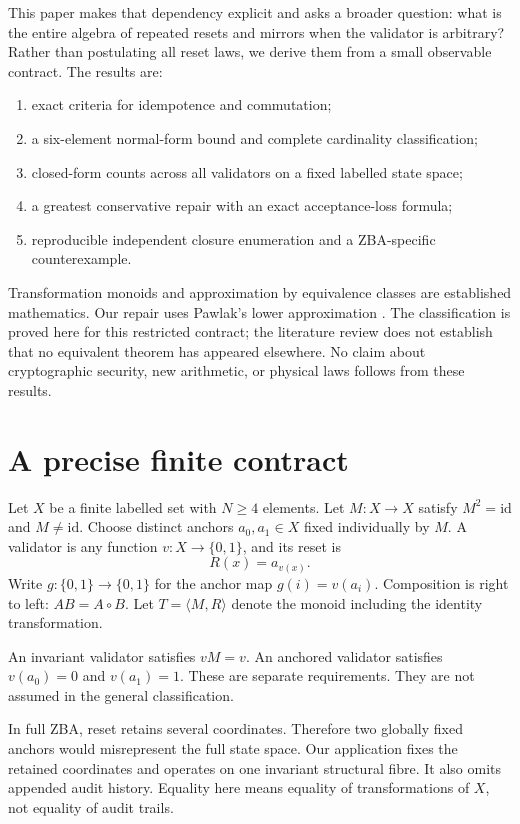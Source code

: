 \documentclass[11pt,a4paper]{article}
\newcommand{\id}{\mathrm{id}}
\begin{document}
This paper makes that dependency explicit and asks a broader question: what is the entire algebra of repeated resets and mirrors when the validator is arbitrary? Rather than postulating all reset laws, we derive them from a small observable contract. The results are:
\begin{enumerate}
\item exact criteria for idempotence and commutation;
\item a six-element normal-form bound and complete cardinality classification;
\item closed-form counts across all validators on a fixed labelled state space;
\item a greatest conservative repair with an exact acceptance-loss formula;
\item reproducible independent closure enumeration and a ZBA-specific counterexample.
\end{enumerate}
Transformation monoids and approximation by equivalence classes are established mathematics. Our repair uses Pawlak's lower approximation \cite{pawlak,yao}. The classification is proved here for this restricted contract; the literature review does not establish that no equivalent theorem has appeared elsewhere. No claim about cryptographic security, new arithmetic, or physical laws follows from these results.

\section{A precise finite contract}
Let $X$ be a finite labelled set with $N\geq4$ elements. Let $M:X\to X$ satisfy $M^2=\id$ and $M\ne\id$. Choose distinct anchors $a_0,a_1\in X$ fixed individually by $M$. A validator is any function $v:X\to\{0,1\}$, and its reset is
\[
 R(x)=a_{v(x)}.
\]
Write $g:\{0,1\}\to\{0,1\}$ for the anchor map $g(i)=v(a_i)$. Composition is right to left: $AB=A\circ B$. Let $T=\langle M,R\rangle$ denote the monoid including the identity transformation.

An invariant validator satisfies $vM=v$. An anchored validator satisfies $v(a_0)=0$ and $v(a_1)=1$. These are separate requirements. They are not assumed in the general classification.

In full ZBA, reset retains several coordinates. Therefore two globally fixed anchors would misrepresent the full state space. Our application fixes the retained coordinates and operates on one invariant structural fibre. It also omits appended audit history. Equality here means equality of transformations of $X$, not equality of audit trails.
\end{document}
